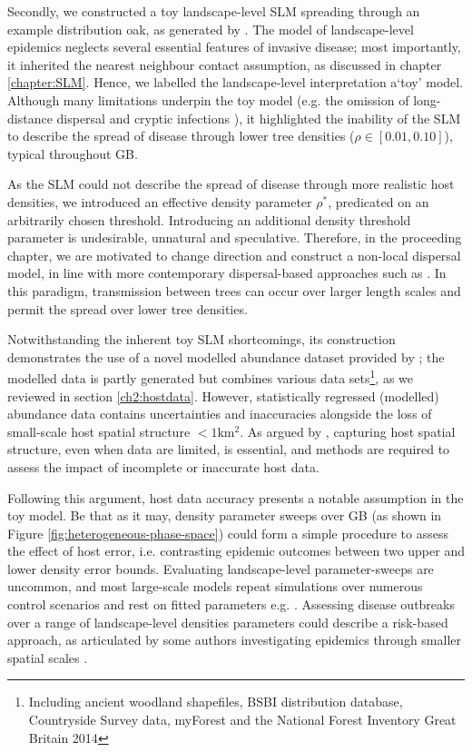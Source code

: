 Secondly, we constructed a toy landscape-level SLM spreading through an example distribution oak, as generated by \cite{hill.data}.
The model of landscape-level epidemics neglects several essential features of invasive disease; most importantly, 
it inherited the nearest neighbour contact assumption, as discussed in chapter \ref{chapter:SLM}.
Hence, we labelled the landscape-level interpretation a`toy' model.
Although many limitations underpin the toy model (e.g. the omission of long-distance dispersal \cite{long-range-dispersal}
and cryptic infections \cite{gilligan2007impact}), it highlighted the inability of the SLM to describe the spread of disease
through lower tree densities ($\rho \in [0.01, 0.10]$), typical throughout GB.

As the SLM could not describe the spread of disease through more realistic host densities, 
we introduced an effective density parameter $\rho^*$, predicated on an arbitrarily chosen threshold.
Introducing an additional density threshold parameter is undesirable, unnatural and speculative.
Therefore, in the proceeding chapter, we are motivated to change direction and construct a non-local
dispersal model, in line with more contemporary dispersal-based approaches such as \cite{parnell2009optimal, meentemeyer2011epidemiological}.
In this paradigm, transmission between trees can occur over larger length scales and permit the spread over lower tree densities. 

Notwithstanding the inherent toy SLM shortcomings, its construction demonstrates the use of a novel modelled abundance
dataset provided by \cite{hill.data};
the modelled data is partly generated but combines various data sets\footnote{
Including ancient woodland shapefiles, BSBI distribution database, Countryside Survey data, myForest and the National Forest Inventory Great Britain 2014},
as we reviewed in section \ref{ch2:hostdata}.
However, statistically regressed (modelled) abundance data contains uncertainties and 
inaccuracies alongside the loss of small-scale host spatial structure $<1\mathrm{km^2}$.
As argued by \cite{13-challenges}, capturing host spatial structure, even when data are limited, 
is essential, and methods are required to assess the impact of incomplete or inaccurate host data.

Following this argument, host data accuracy presents a notable assumption in the toy model.
Be that as it may, density parameter sweeps over GB (as shown in Figure \ref{fig:heterogeneous-phase-space}) could 
form a simple procedure to assess the effect of host error, i.e. contrasting epidemic outcomes between two upper
and lower density error bounds. Evaluating landscape-level parameter-sweeps are uncommon, 
and most large-scale models repeat simulations over numerous control scenarios and rest on 
fitted parameters e.g. \cite{large-scale-control, doi:10.1111/j.1365-3059.2010.02391.x}.
Assessing disease outbreaks over a range of landscape-level densities parameters could describe a risk-based approach,
as articulated by some authors investigating epidemics through smaller spatial scales \cite{risk-potential-control}.

\newpage